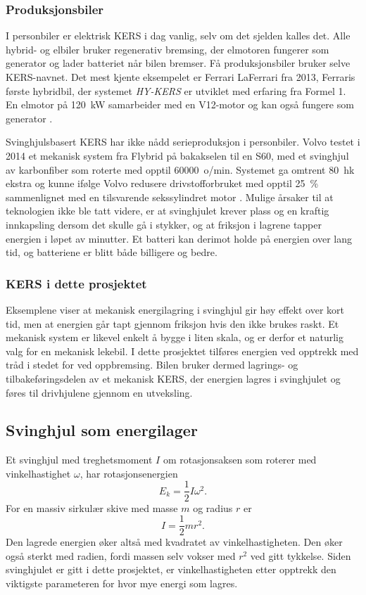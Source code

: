 \subsubsection{Produksjonsbiler}
I personbiler er elektrisk KERS i dag vanlig, selv om det sjelden kalles det. Alle hybrid- og elbiler bruker regenerativ bremsing, der elmotoren fungerer som generator og lader batteriet når bilen bremser. Få produksjonsbiler bruker selve KERS-navnet. Det mest kjente eksempelet er Ferrari LaFerrari fra 2013, Ferraris første hybridbil, der systemet \emph{HY-KERS} er utviklet med erfaring fra Formel 1. En elmotor på \SI{120}{kW} samarbeider med en V12-motor og kan også fungere som generator \parencite{marelli_hykers}.

Svinghjulsbasert KERS har ikke nådd serieproduksjon i personbiler. Volvo testet i 2014 et mekanisk system fra Flybrid på bakakselen til en S60, med et svinghjul av karbonfiber som roterte med opptil \num{60000}~o/min. Systemet ga omtrent \SI{80}{hk} ekstra og kunne ifølge Volvo redusere drivstofforbruket med opptil \SI{25}{\percent} sammenlignet med en tilsvarende sekssylindret motor \parencite{autoexpress_volvo}. Mulige årsaker til at teknologien ikke ble tatt videre, er at svinghjulet krever plass og en kraftig innkapsling dersom det skulle gå i stykker, og at friksjon i lagrene tapper energien i løpet av minutter. Et batteri kan derimot holde på energien over lang tid, og batteriene er blitt både billigere og bedre.

\subsubsection{KERS i dette prosjektet}
Eksemplene viser at mekanisk energilagring i svinghjul gir høy effekt over kort tid, men at energien går tapt gjennom friksjon hvis den ikke brukes raskt. Et mekanisk system er likevel enkelt å bygge i liten skala, og er derfor et naturlig valg for en mekanisk lekebil. I dette prosjektet tilføres energien ved opptrekk med tråd i stedet for ved oppbremsing. Bilen bruker dermed lagrings- og tilbakeføringsdelen av et mekanisk KERS, der energien lagres i svinghjulet og føres til drivhjulene gjennom en utveksling.

\subsection{Svinghjul som energilager}
Et svinghjul med treghetsmoment $I$ om rotasjonsaksen som roterer med vinkelhastighet $\omega$, har rotasjonsenergien
\begin{equation}
    E_k = \frac{1}{2} I \omega^2 .
    \label{eq:rotasjonsenergi}
\end{equation}
For en massiv sirkulær skive med masse $m$ og radius $r$ er
\begin{equation}
    I = \frac{1}{2} m r^2 .
    \label{eq:treghetsmoment}
\end{equation}
Den lagrede energien øker altså med kvadratet av vinkelhastigheten. Den øker også sterkt med radien, fordi massen selv vokser med $r^2$ ved gitt tykkelse. Siden svinghjulet er gitt i dette prosjektet, er vinkelhastigheten etter opptrekk den viktigste parameteren for hvor mye energi som lagres.

